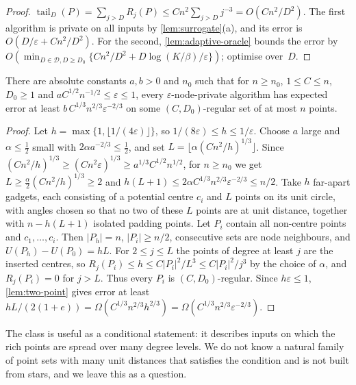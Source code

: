 \documentclass[anonymous,a4paper,USenglish,cleveref,autoref,thm-restate]{socg-lipics-v2021}
\newcommand{\eps}{\varepsilon}
\newcommand{\tail}{\operatorname{tail}}
\begin{document}
\begin{proof}
$\tail_D(P)=\sum_{j>D}R_j(P)\le Cn^2\sum_{j>D}j^{-3}=O(Cn^2/D^2)$. The first algorithm is private on all inputs by \cref{lem:surrogate}(a), and its error is $O(D/\eps+Cn^2/D^2)$. For the second, \cref{lem:adaptive-oracle} bounds the error by $O(\min_{D\in\mathcal D,D\ge D_0}\{Cn^2/D^2+D\log(K/\beta)/\eps\})$; optimise over~$D$.
\end{proof}

\begin{proposition}
\label{prop:promise-lower}
There are absolute constants $a,b>0$ and $n_0$ such that for $n\ge n_0$, $1\le C\le n$, $D_0\ge1$ and $aC^{1/2}n^{-1/2}\le\eps\le1$, every $\eps$-node-private algorithm has expected error at least $b\,C^{1/3}n^{2/3}\eps^{-2/3}$ on some $(C,D_0)$-regular set of at most $n$ points.
\end{proposition}

\begin{proof}
Let $h=\max\{1,\lfloor1/(4\eps)\rfloor\}$, so $1/(8\eps)\le h\le1/\eps$. Choose $a$ large and $\alpha\le\frac12$ small with $2\alpha a^{-2/3}\le\frac12$, and set $L=\lfloor\alpha(Cn^2/h)^{1/3}\rfloor$. Since $(Cn^2/h)^{1/3}\ge(Cn^2\eps)^{1/3}\ge a^{1/3}C^{1/2}n^{1/2}$, for $n\ge n_0$ we get $L\ge\frac\alpha2(Cn^2/h)^{1/3}\ge2$ and $h(L+1)\le2\alpha C^{1/3}n^{2/3}\eps^{-2/3}\le n/2$.
Take $h$ far-apart gadgets, each consisting of a potential centre $c_i$ and $L$ points on its unit circle, with angles chosen so that no two of these $L$ points are at unit distance, together with $n-h(L+1)$ isolated padding points. Let $P_i$ contain all non-centre points and $c_1,\dots,c_i$. Then $|P_h|=n$, $|P_i|\ge n/2$, consecutive sets are node neighbours, and $U(P_h)-U(P_0)=hL$. For $2\le j\le L$ the points of degree at least $j$ are the inserted centres, so $R_j(P_i)\le h\le C|P_i|^2/L^3\le C|P_i|^2/j^3$ by the choice of $\alpha$, and $R_j(P_i)=0$ for $j>L$. Thus every $P_i$ is $(C,D_0)$-regular. Since $h\eps\le1$, \cref{lem:two-point} gives error at least $hL/(2(1+e))=\Omega(C^{1/3}n^{2/3}h^{2/3})=\Omega(C^{1/3}n^{2/3}\eps^{-2/3})$.
\end{proof}

The class is useful as a conditional statement: it describes inputs on which the rich points are spread over many degree levels. We do not know a natural family of point sets with many unit distances that satisfies the condition and is not built from stars, and we leave this as a question.

\end{document}
